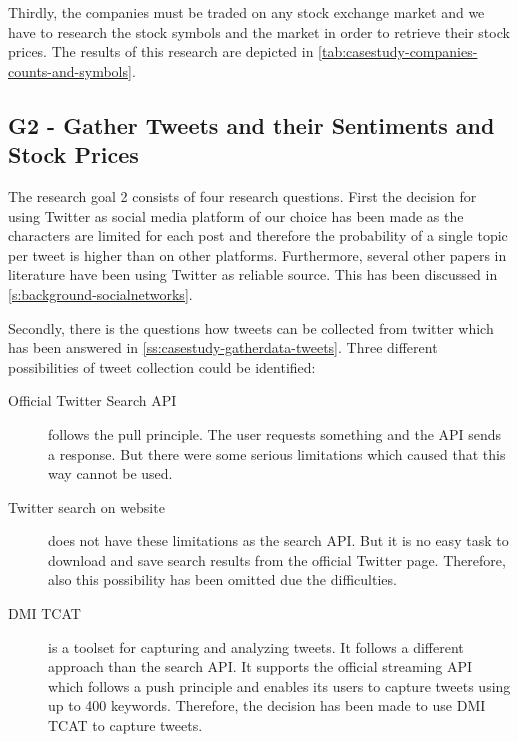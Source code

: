 Thirdly, the companies must be traded on any stock exchange market and we have to research the stock symbols and the market in order to retrieve their stock prices.
The results of this research are depicted in \cref{tab:casestudy-companies-counts-and-symbols}.

\subsection{G2 - Gather Tweets and their Sentiments and Stock Prices}
\label{ss:conclusion-summary-g2}


The research goal 2 consists of four research questions.
First the decision for using Twitter as social media platform of our choice has been made as the characters are limited for each post and therefore the probability of a single topic per tweet is higher than on other platforms.
Furthermore, several other papers in literature have been using Twitter as reliable source.
This has been discussed in \cref{s:background-socialnetworks}.

Secondly, there is the questions how tweets can be collected from twitter which has been answered in \cref{ss:casestudy-gatherdata-tweets}.
Three different possibilities of tweet collection could be identified:

\begin{description}
    \item[Official Twitter Search \ac{API}]
        follows the pull principle. 
        The user requests something and the \ac{API} sends a response.
        But there were some serious limitations which caused that this way cannot be used.

    \item[Twitter search on website]
        does not have these limitations as the search \ac{API}.
        But it is no easy task to download and save search results from the official Twitter page.
        Therefore, also this possibility has been omitted due the difficulties.    
    
    \item[DMI TCAT] 
        is a toolset for capturing and analyzing tweets.
        It follows a different approach than the search \ac{API}.
        It supports the official streaming \ac{API} which follows a push principle and enables its users to capture tweets using up to 400 keywords.
        Therefore, the decision has been made to use DMI TCAT to capture tweets.

\end{description}

